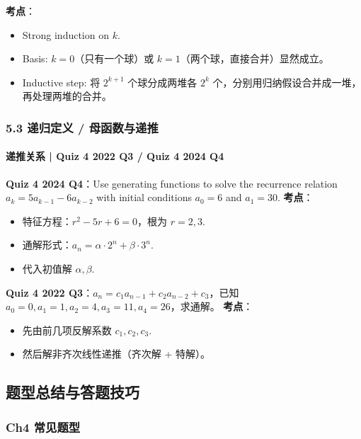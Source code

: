 \documentclass[10pt,a4paper,openany]{ctexbook}
\theoremstyle{definition}
\theoremstyle{remark}
\begin{document}
\textbf{考点}：
\begin{itemize}
\item Strong induction on $k$.
\item Basis: $k=0$（只有一个球）或 $k=1$（两个球，直接合并）显然成立。
\item Inductive step: 将 $2^{k+1}$ 个球分成两堆各 $2^k$ 个，分别用归纳假设合并成一堆，再处理两堆的合并。

\end{itemize}

\vspace{-2pt}

\subsubsection{5.3 递归定义 / 母函数与递推}

\paragraph{递推关系 | Quiz 4 2022 Q3 / Quiz 4 2024 Q4}

\textbf{Quiz 4 2024 Q4}：Use generating functions to solve the recurrence relation $a_k = 5a_{k-1} - 6a_{k-2}$ with initial conditions $a_0 = 6$ and $a_1 = 30$.
\textbf{考点}：
\begin{itemize}
\item 特征方程：$r^2 - 5r + 6 = 0$，根为 $r=2, 3$.
\item 通解形式：$a_n = \alpha \cdot 2^n + \beta \cdot 3^n$.
\item 代入初值解 $\alpha, \beta$.

\end{itemize}

\textbf{Quiz 4 2022 Q3}：$a_n = c_1 a_{n-1} + c_2 a_{n-2} + c_3$，已知 $a_0 = 0, a_1 = 1, a_2 = 4, a_3 = 11, a_4 = 26$，求通解。
\textbf{考点}：
\begin{itemize}
\item 先由前几项反解系数 $c_1, c_2, c_3$.
\item 然后解非齐次线性递推（齐次解 + 特解）。

\end{itemize}

\vspace{-2pt}

\subsection{题型总结与答题技巧}

\subsubsection{Ch4 常见题型}
\end{document}
